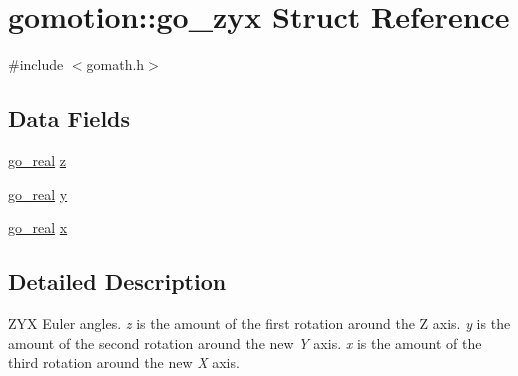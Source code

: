 \hypertarget{structgomotion_1_1go__zyx}{\section{gomotion\-:\-:go\-\_\-zyx Struct Reference}
\label{structgomotion_1_1go__zyx}
}


{\ttfamily \#include $<$gomath.\-h$>$}

\subsection*{Data Fields}
\begin{DoxyCompactItemize}
\item 
\hyperlink{gotypes_8h_afd666a2393eebd71ee455846ac9def9b}{go\-\_\-real} \hyperlink{structgomotion_1_1go__zyx_aa05f917941bc93c5f19298a1dd16d4f6}{z}
\item 
\hyperlink{gotypes_8h_afd666a2393eebd71ee455846ac9def9b}{go\-\_\-real} \hyperlink{structgomotion_1_1go__zyx_a014cdc80c1901732b84cb1eb65258a82}{y}
\item 
\hyperlink{gotypes_8h_afd666a2393eebd71ee455846ac9def9b}{go\-\_\-real} \hyperlink{structgomotion_1_1go__zyx_aa79612f67b18b68f67cb02bde877c083}{x}
\end{DoxyCompactItemize}


\subsection{Detailed Description}
Z\-Y\-X Euler angles. {\itshape z} is the amount of the first rotation around the Z axis. {\itshape y} is the amount of the second rotation around the new {\itshape Y} axis. {\itshape x} is the amount of the third rotation around the new {\itshape X} axis. 

